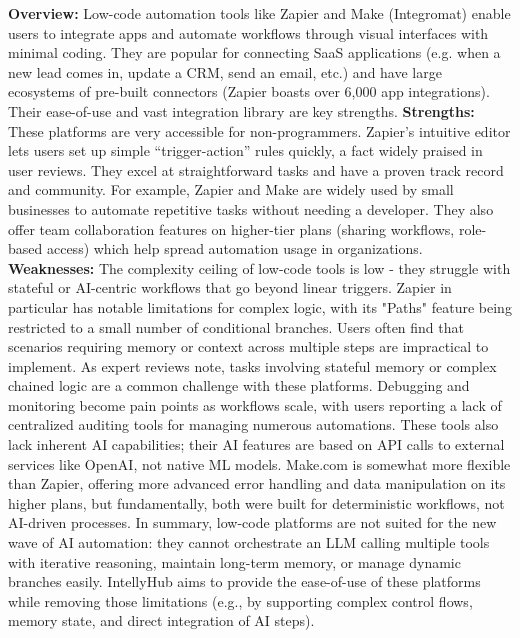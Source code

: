 \documentclass[11pt, a4paper, oneside]{article}
\begin{document}
\textbf{Overview:} Low-code automation tools like Zapier and Make (Integromat) enable users to integrate apps and automate workflows through visual interfaces with minimal coding. They are popular for connecting SaaS applications (e.g. when a new lead comes in, update a CRM, send an email, etc.) and have large ecosystems of pre-built connectors (Zapier boasts over 6,000 app integrations\cite{zapierApps}). Their ease-of-use and vast integration library are key strengths.
\newline\newline
\textbf{Strengths:} These platforms are very accessible for non-programmers. Zapier's intuitive editor lets users set up simple “trigger-action” rules quickly, a fact widely praised in user reviews\cite{g2ZapierReviews}. They excel at straightforward tasks and have a proven track record and community. For example, Zapier and Make are widely used by small businesses to automate repetitive tasks without needing a developer. They also offer team collaboration features on higher-tier plans (sharing workflows, role-based access) which help spread automation usage in organizations\cite{zapierPricing}.
\newline\newline
\textbf{Weaknesses:} The complexity ceiling of low-code tools is low - they struggle with stateful or AI-centric workflows that go beyond linear triggers. Zapier in particular has notable limitations for complex logic, with its "Paths" feature being restricted to a small number of conditional branches. Users often find that scenarios requiring memory or context across multiple steps are impractical to implement. As expert reviews note, tasks involving stateful memory or complex chained logic are a common challenge with these platforms. Debugging and monitoring become pain points as workflows scale, with users reporting a lack of centralized auditing tools for managing numerous automations\cite{g2ZapierReviews}. These tools also lack inherent AI capabilities; their AI features are based on API calls to external services like OpenAI, not native ML models\cite{zapierOpenAI}. Make.com is somewhat more flexible than Zapier, offering more advanced error handling and data manipulation on its higher plans\cite{g2MakeVsZapier}, but fundamentally, both were built for deterministic workflows, not AI-driven processes. In summary, low-code platforms are not suited for the new wave of AI automation: they cannot orchestrate an LLM calling multiple tools with iterative reasoning, maintain long-term memory, or manage dynamic branches easily. IntellyHub aims to provide the ease-of-use of these platforms while removing those limitations (e.g., by supporting complex control flows, memory state, and direct integration of AI steps).
\end{document}
